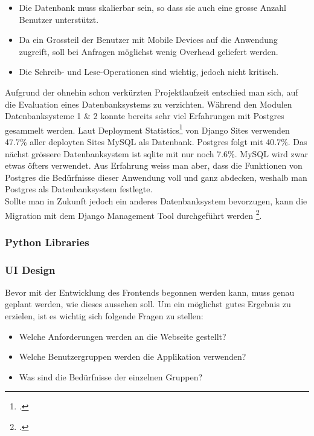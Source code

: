 \begin{itemize}
	\item Die Datenbank muss skalierbar sein, so dass sie auch eine grosse Anzahl Benutzer unterstützt.
	\item Da ein Grossteil der Benutzer mit Mobile Devices auf die Anwendung zugreift, soll bei Anfragen möglichst wenig Overhead geliefert werden.
	\item Die Schreib- und Lese-Operationen sind wichtig, jedoch nicht kritisch. 
\end{itemize}

Aufgrund der ohnehin schon verkürzten Projektlaufzeit entschied man sich, auf die Evaluation eines Datenbanksystems zu verzichten. Während den Modulen Datenbanksysteme 1 \& 2 konnte bereits sehr viel Erfahrungen mit Postgres gesammelt werden. Laut Deployment Statistics\footcite{deploymentstatistics} von Django Sites verwenden 47.7\% aller deployten Sites MySQL als Datenbank. Postgres folgt mit 40.7\%. Das nächst grössere Datenbanksystem ist sqlite mit nur noch 7.6\%.
MySQL wird zwar etwas öfters verwendet. Aus Erfahrung weiss man aber, dass die Funktionen von Postgres die Bedürfnisse dieser Anwendung voll und ganz abdecken, weshalb man Postgres als Datenbanksystem festlegte. \\

Sollte man in Zukunft jedoch ein anderes Datenbanksystem bevorzugen, kann die Migration mit dem Django Management Tool durchgeführt werden \footcite{dbmigration}. 

\subsubsection*{Python Libraries}

\subsubsection{UI Design}
Bevor mit der Entwicklung des Frontends begonnen werden kann, muss genau geplant werden, wie dieses aussehen soll. Um ein möglichst gutes Ergebnis zu erzielen, ist es wichtig sich folgende Fragen zu stellen:

\begin{itemize}
	\item Welche Anforderungen werden an die Webseite gestellt?
	\item Welche Benutzergruppen werden die Applikation verwenden?
	\item Was sind die Bedürfnisse der einzelnen Gruppen?
\end{itemize}

